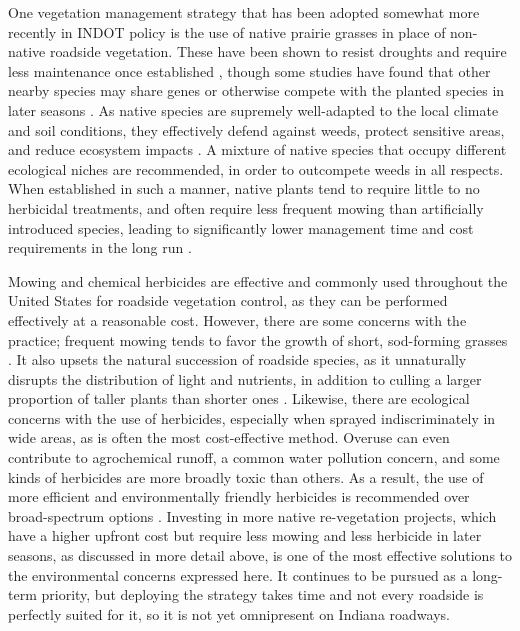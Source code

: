 \documentclass[
]{article}
\begin{document}
One vegetation management strategy that has been adopted somewhat more
recently in INDOT policy is the use of native prairie grasses in place
of non-native roadside vegetation. These have been shown to resist
droughts and require less maintenance once established
\parencite{Herold_IntegratedVegetationManagement_2014}, though some
studies have found that other nearby species may share genes or
otherwise compete with the planted species in later seasons
\parencite{Li_SuccessionalEstablishmentMowing_2008}. As native species
are supremely well-adapted to the local climate and soil conditions,
they effectively defend against weeds, protect sensitive areas, and
reduce ecosystem impacts
\parencite{Steinfeld_RoadsideRevegetationIntegrated_2007}. A mixture of
native species that occupy different ecological niches are recommended,
in order to outcompete weeds in all respects. When established in such a
manner, native plants tend to require little to no herbicidal
treatments, and often require less frequent mowing than artificially
introduced species, leading to significantly lower management time and
cost requirements in the long run
\parencite{Barnes_NativeWarmSeason_2000,ODell_NativeRoadsidePerennial_2007}.

Mowing and chemical herbicides are effective and commonly used
throughout the United States for roadside vegetation control, as they
can be performed effectively at a reasonable cost. However, there are
some concerns with the practice; frequent mowing tends to favor the
growth of short, sod-forming grasses
\parencite{Li_SuccessionalEstablishmentMowing_2008}. It also upsets the
natural succession of roadside species, as it unnaturally disrupts the
distribution of light and nutrients, in addition to culling a larger
proportion of taller plants than shorter ones
\parencite{Ryu_QuantifyingBenefitsRoadside_2025}. Likewise, there are
ecological concerns with the use of herbicides, especially when sprayed
indiscriminately in wide areas, as is often the most cost-effective
method. Overuse can even contribute to agrochemical runoff, a common
water pollution concern, and some kinds of herbicides are more broadly
toxic than others. As a result, the use of more efficient and
environmentally friendly herbicides is recommended over broad-spectrum
options \parencite{Li_SuccessionalEstablishmentMowing_2008}. Investing in
more native re-vegetation projects, which have a higher upfront cost but
require less mowing and less herbicide in later seasons, as discussed in
more detail above, is one of the most effective solutions to the
environmental concerns expressed here. It continues to be pursued as a
long-term priority, but deploying the strategy takes time and not every
roadside is perfectly suited for it, so it is not yet omnipresent on
Indiana roadways.
\end{document}
